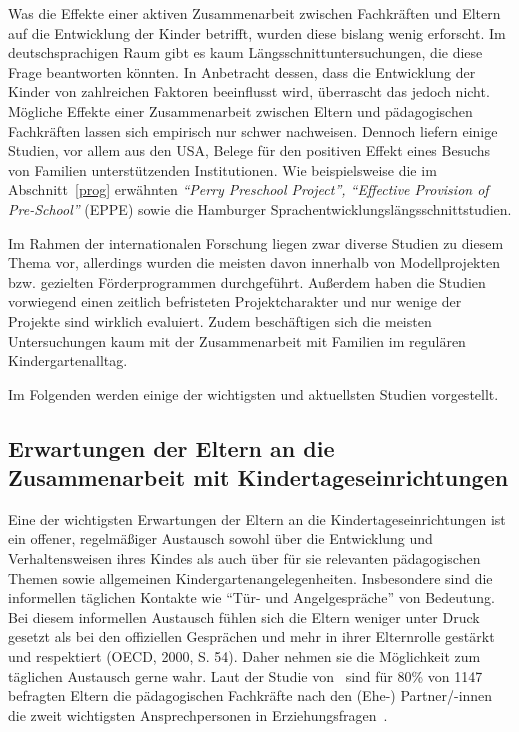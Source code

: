 \documentclass[12pt,a4paper]{article}
\begin{document}
	Was die Effekte einer aktiven Zusammenarbeit zwischen Fachkräften und Eltern auf die Entwicklung der Kinder betrifft, wurden diese bislang wenig erforscht. Im deutschsprachigen Raum gibt es kaum Längsschnittuntersuchungen, die diese Frage beantworten könnten. In Anbetracht dessen, dass die Entwicklung der Kinder von zahlreichen Faktoren beeinflusst wird, überrascht das jedoch nicht. Mögliche Effekte einer Zusammenarbeit zwischen Eltern und pädagogischen Fachkräften lassen sich empirisch nur schwer nachweisen. Dennoch liefern einige Studien, vor allem aus den USA, Belege für den positiven Effekt eines Besuchs von Familien unterstützenden Institutionen. Wie beispielsweise die im Abschnitt~\ref{prog} erwähnten \textit{"`Perry Preschool Project"', "`Effective Provision of Pre-School"'} (EPPE) sowie die Hamburger Sprachentwicklungslängsschnittstudien.
	
Im Rahmen der internationalen Forschung liegen zwar diverse Studien zu diesem Thema vor, allerdings wurden die meisten davon innerhalb von Modellprojekten bzw. gezielten Förderprogrammen durchgeführt. Außerdem haben die Studien vorwiegend einen zeitlich befristeten Projektcharakter und nur wenige der Projekte sind wirklich evaluiert. Zudem beschäftigen sich die meisten Untersuchungen kaum mit der Zusammenarbeit mit Familien im regulären Kindergartenalltag.

Im Folgenden werden einige der wichtigsten und aktuellsten Studien vorgestellt.

\subsection{Erwartungen der Eltern an die Zusammenarbeit mit Kindertageseinrichtungen} 
Eine der wichtigsten Erwartungen der Eltern an die Kindertageseinrichtungen ist ein offener, regelmäßiger Austausch sowohl über die Entwicklung und Verhaltensweisen ihres Kindes als auch über für sie relevanten pädagogischen Themen sowie allgemeinen Kindergartenangelegenheiten. Insbesondere sind die informellen täglichen Kontakte wie "`Tür- und Angelgespräche"' von Bedeutung. Bei diesem informellen Austausch fühlen sich die Eltern weniger unter Druck gesetzt als bei den offiziellen Gesprächen und mehr in ihrer Elternrolle gestärkt und respektiert (OECD, 2000, S. 54). Daher nehmen sie die Möglichkeit zum täglichen Austausch gerne wahr. Laut der Studie von~\textcite{Froelich} sind für 80\% von 1147 befragten Eltern die pädagogischen Fachkräfte nach den (Ehe-) Partner/-innen die zweit wichtigsten Ansprechpersonen in Erziehungsfragen~\parencite[S.~10]{Froelich}.
	
\end{document}
